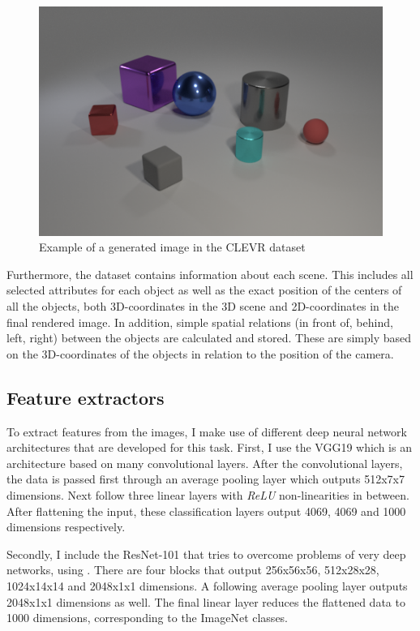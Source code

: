 \begin{figure}[h]
    \centering
    \includegraphics[width=.8\linewidth]{figures/CLEVR_example.png}
    \caption{Example of a generated image in the CLEVR dataset}
    \label{fig:clevr-example}
\end{figure}

Furthermore, the dataset contains information about each scene.
This includes all selected attributes for each object as well as the exact position of the centers of all the objects, both 3D-coordinates in the 3D scene and 2D-coordinates in the final rendered image.
In addition, simple spatial relations (in front of, behind, left, right) between the objects are calculated and stored.
These are simply based on the 3D-coordinates of the objects in relation to the position of the camera.


\subsection{Feature extractors}
To extract features from the images, I make use of different deep neural network architectures that are developed for this task.
First, I use the  VGG19 \citep{Simonyan2015} which is an architecture based on many convolutional layers.
After the convolutional layers, the data is passed first through an average pooling layer which outputs 512x7x7 dimensions.
Next follow three linear layers with \emph{ReLU} non-linearities in between.
After flattening the input, these classification layers output 4069, 4069 and 1000 dimensions respectively.

Secondly, I include the ResNet-101 \citep{He2016} that tries to overcome problems of very deep networks, using .
There are four blocks that output 256x56x56, 512x28x28, 1024x14x14 and 2048x1x1 dimensions.
A following average pooling layer outputs 2048x1x1 dimensions as well.
The final linear layer reduces the flattened data to 1000 dimensions, corresponding to the ImageNet classes.

